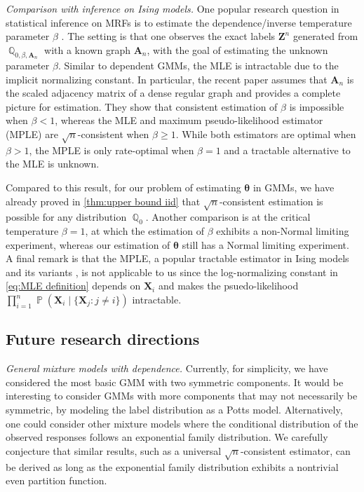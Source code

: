 \documentclass[preprint,reqno]{imsart}
\newcommand{\ttheta}{\boldsymbol{\theta}}
\DeclareMathOperator{\PP}{\mathbb{P}}
\DeclareMathOperator{\QQ}{\mathbb{Q}}
\newcommand{\A}{\mathbf{A}}
\newcommand{\Z}{\mathbf{Z}}
\newcommand{\X}{\mathbf{X}}
\begin{document}
\vspace{2mm}

\noindent \emph{Comparison with inference on Ising models.} 
One popular research question in statistical inference on MRFs is to estimate 
the dependence/inverse temperature parameter $\beta$ \citep{comets1991asymptotics, chatterjee2007estimation, bhattacharya2018inference, ghosal2020joint, xu2023inference, mukherjee2021efficient}. The setting is that one observes the exact labels $\Z^n$ generated from $\QQ_{0, \beta, \A_n}$ with a known graph $ \A_n$, with the goal of estimating the unknown parameter $\beta$. 
Similar to dependent GMMs, the MLE is intractable due to the implicit normalizing constant. In particular, the recent paper \cite{xu2023inference} assumes that  $ \A_n$ is the scaled adjacency matrix of a dense regular graph and provides a complete picture for estimation. They show that consistent estimation of $\beta$ is impossible when $\beta < 1$, whereas the MLE and maximum pseudo-likelihood estimator (MPLE)
%
are $\sqrt{n}$-consistent when $\beta \ge 1$. While both estimators are optimal when $\beta > 1$, the MPLE is only rate-optimal when $\beta = 1$ and a tractable alternative to the MLE is unknown. 

Compared to this result, for our problem of estimating $\ttheta$ in GMMs, we have already proved in \cref{thm:upper bound iid} that $\sqrt{n}$-consistent estimation is possible for any distribution $\QQ_0$. %
%
Another comparison is at the critical temperature $\beta = 1$, at which the estimation of $\beta$ exhibits a non-Normal limiting experiment, whereas our estimation of $\ttheta$ still has a Normal limiting experiment. A final remark is that the MPLE, a popular tractable estimator in Ising models and its variants \citep{chatterjee2007estimation, daskalakis2019regression, mukherjee2022estimation, dagan2021learning}, is not applicable to us since the log-normalizing constant in \eqref{eq:MLE definition} depends on $\X_i$ and makes the psuedo-likelihood $\prod_{i=1}^n \PP(\X_i \mid \{\X_j: j\neq i\})$ intractable.

\subsection{Future research directions}
\noindent \emph{General mixture models with dependence.} 
%
Currently, for simplicity, we have considered the most basic GMM with two symmetric components. It would be interesting to consider GMMs with more components that may not necessarily be symmetric, by modeling the label distribution as a Potts model. %
Alternatively, one could consider other mixture models where the conditional distribution of the observed responses follows an exponential family distribution. We carefully conjecture that similar results, such as a universal $\sqrt{n}$-consistent estimator, can be derived as long as the exponential family distribution exhibits a nontrivial even partition function. 
%
\end{document}

